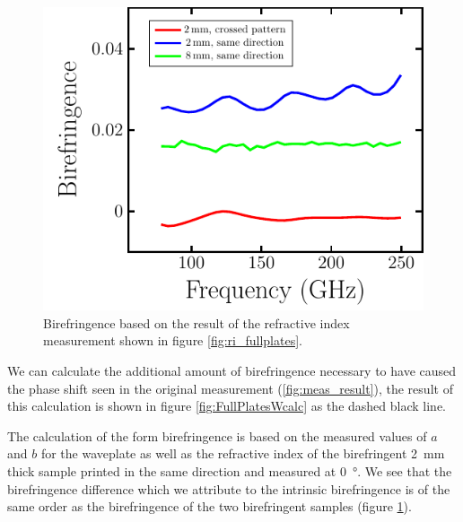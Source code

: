 \begin{figure}[H]
    \centering
    \includegraphics[scale=.7]{images/results/plots/polymer/IntrinsicBF/FullPlates.pdf}
    \caption{Birefringence based on the result of the refractive index measurement shown in figure \ref{fig:ri_fullplates}.}
    \label{fig:FullPlates_bf}
\end{figure}

We can calculate the additional amount of birefringence necessary to have caused the phase shift seen in the original measurement (\ref{fig:meas_result}), the result of this calculation is shown in figure \ref{fig:FullPlatesWcalc} as the dashed black line. 

The calculation of the form birefringence is based on the measured values of $a$ and $b$ for the waveplate as well as the refractive index of the birefringent \SI{2}{\milli \meter} thick sample printed in the same direction and measured at \SI{0}{\degree}. We see that the birefringence difference which we attribute to the intrinsic birefringence is of the same order as the birefringence of the two birefringent samples (figure \ref{fig:FullPlates_bf}). 


